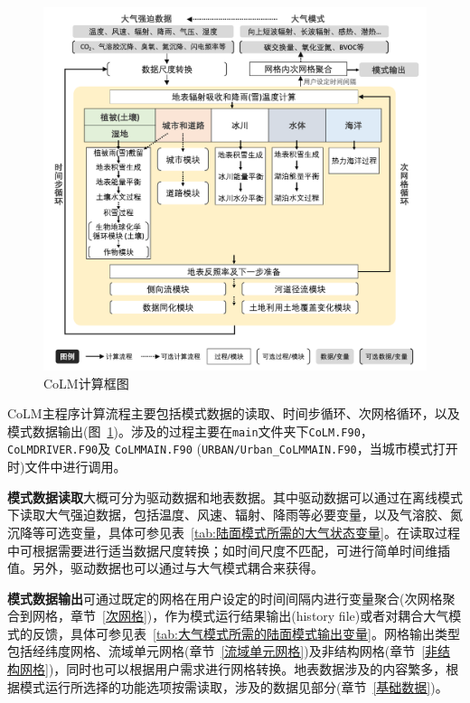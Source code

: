 {
  \begin{figure}[htbp]
    \centering
    \includegraphics[width=\textwidth]{Figures/模式构架/CoLM计算框图_v7.png}
    \caption{CoLM计算框图}
    \label{fig:CoLM计算框图}
  \end{figure}
}

CoLM主程序计算流程主要包括模式数据的读取、时间步循环、次网格循环，以及模式数据输出(图~\ref{fig:CoLM计算框图})。涉及的过程主要在\texttt{main}文件夹下\texttt{CoLM.F90}，\texttt{CoLMDRIVER.F90}及 \allowbreak \texttt{CoLMMAIN.F90}
\allowbreak (\texttt{URBAN\allowbreak /Urban\allowbreak \_CoLMMAIN.F90}，当城市模式打开时)文件中进行调用。

\textbf{模式数据读取}大概可分为驱动数据和地表数据。其中驱动数据可以通过在离线模式下读取大气强迫数据，包括温度、风速、辐射、降雨等必要变量，以及气溶胶、氮沉降等可选变量，具体可参见表~\ref{tab:陆面模式所需的大气状态变量}。在读取过程中可根据需要进行适当数据尺度转换；如时间尺度不匹配，可进行简单时间维插值。另外，驱动数据也可以通过与大气模式耦合来获得。

\textbf{模式数据输出}可通过既定的网格在用户设定的时间间隔内进行变量聚合(次网格聚合到网格，章节~\ref{次网格})，作为模式运行结果输出(history file)或者对耦合大气模式的反馈，具体可参见表~\ref{tab:大气模式所需的陆面模式输出变量}。网格输出类型包括经纬度网格、流域单元网格(章节~\ref{流域单元网格})及非结构网格(章节~\ref{非结构网格})，同时也可以根据用户需求进行网格转换。地表数据涉及的内容繁多，根据模式运行所选择的功能选项按需读取，涉及的数据见部分(章节~\ref{基础数据})。

